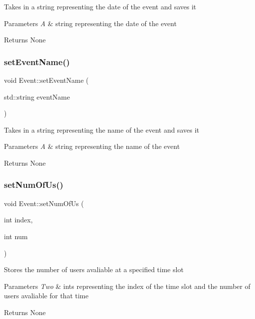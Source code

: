 Takes in a string representing the date of the event and saves it 
\begin{DoxyParams}{Parameters}
{\em A} & string representing the date of the event \\
\hline
\end{DoxyParams}
\begin{DoxyReturn}{Returns}
None 
\end{DoxyReturn}
\mbox{\label{class_event_a4c6829c10c6c865759221d57a0f4a64f}} 
\subsubsection{\texorpdfstring{set\+Event\+Name()}{setEventName()}}
{\footnotesize\ttfamily void Event\+::set\+Event\+Name (\begin{DoxyParamCaption}\item[{std\+::string}]{event\+Name }\end{DoxyParamCaption})}

Takes in a string representing the name of the event and saves it 
\begin{DoxyParams}{Parameters}
{\em A} & string representing the name of the event \\
\hline
\end{DoxyParams}
\begin{DoxyReturn}{Returns}
None 
\end{DoxyReturn}
\mbox{\label{class_event_ab573b9da583f00cd5d60934fb594e1ac}} 
\subsubsection{\texorpdfstring{set\+Num\+Of\+Us()}{setNumOfUs()}}
{\footnotesize\ttfamily void Event\+::set\+Num\+Of\+Us (\begin{DoxyParamCaption}\item[{int}]{index,  }\item[{int}]{num }\end{DoxyParamCaption})}

Stores the number of users avaliable at a specified time slot 
\begin{DoxyParams}{Parameters}
{\em Two} & ints representing the index of the time slot and the number of users avaliable for that time \\
\hline
\end{DoxyParams}
\begin{DoxyReturn}{Returns}
None 
\end{DoxyReturn}


